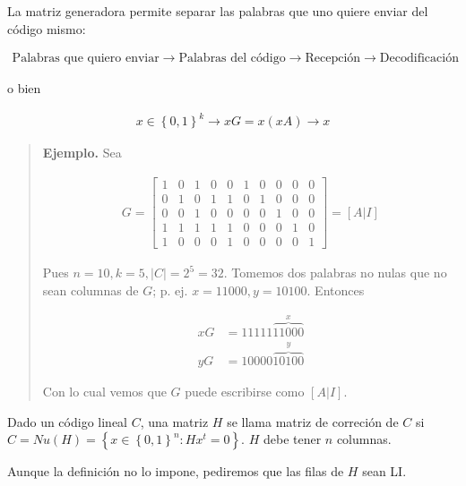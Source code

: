 \documentclass[a4paper]{article}
\begin{document}
La matriz generadora permite separar las palabras que uno quiere enviar 
del código mismo: 

\begin{align*}
    \text{Palabras que quiero enviar} \to \text{Palabras del código} \to  \text{Recepción} \to \text{Decodificación}
\end{align*}

o bien 

\begin{align*}
    x \in \left\{ 0, 1 \right\}^k \to xG = x(xA) \to x
\end{align*}


\small
\begin{quote}

\textbf{Ejemplo.} Sea 

\begin{align*}
    G = \begin{bmatrix} 
        1 & 0 & 1 & 0 & 0 & 1 & 0 & 0 & 0 & 0 \\
        0 & 1 & 0 & 1 & 1 & 0 & 1 & 0 & 0 & 0 \\
        0 & 0 & 1 & 0 & 0 & 0 & 0 & 1 & 0 & 0\\ 
        1 & 1 & 1 & 1 & 1 & 0 & 0 & 0 & 1 & 0\\ 
        1 & 0 & 0 & 0 & 1 & 0 & 0 & 0 & 0 & 1 
    \end{bmatrix} = [A | I]
\end{align*}

Pues $n = 10, k = 5, |C| = 2^5 = 32$. Tomemos dos palabras no nulas que 
no sean columnas de $G$; p. ej. $x = 11000, y = 10100$. Entonces 

\begin{align*}
    xG &= 11111 \overbrace{11000}^{x}\\
    yG &= 10000 \overbrace{10100}^{y}
\end{align*}

Con lo cual vemos que $G$ puede escribirse como $[A | I]$.


\end{quote}
\normalsize

\begin{definition}
    Dado un código lineal $C$, una matriz $H$ se llama matriz de correción de $C$
    si $C = Nu(H) = \left\{ x \in \left\{ 0, 1 \right\}^n : Hx^t = 0  \right\} $.
    $H$ debe tener $n$ columnas. 
\end{definition}

Aunque la definición no lo impone, pediremos que las filas de $H$ sean LI.
\end{document}
